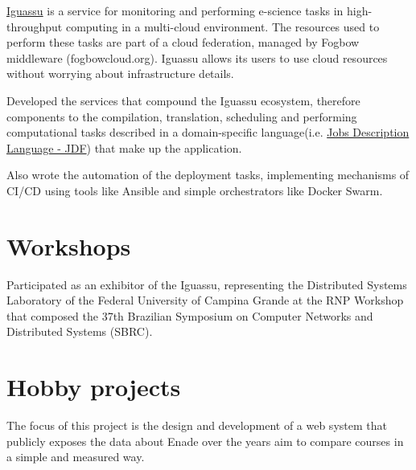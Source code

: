 \documentclass[]{deedy-resume-openfont}
\begin{document}
\begin{minipage}[t]{0.65\textwidth}
\vspace{\topsep} %
\begin{tightemize}
\item \href{https://github.com/ufcg-lsd/iguassu}{Iguassu} is a service for monitoring and performing e-science tasks in high-throughput computing in a multi-cloud environment. The resources used to perform these tasks are part of a cloud federation, managed by Fogbow middleware (fogbowcloud.org). Iguassu allows its users to use cloud resources without worrying about infrastructure details.
\item Developed the services that compound the Iguassu ecosystem, therefore components to the compilation, translation, scheduling and performing computational tasks described in a domain-specific language(i.e. \href{http://ourgrid.lsd.ufcg.edu.br/use.php#site1}{Jobs Description Language - JDF}) that make up the application.
\item Also wrote the automation of the deployment tasks, implementing mechanisms of CI/CD using tools like Ansible and simple orchestrators like Docker Swarm.
\end{tightemize}
\sectionsep

\section{Workshops}

\vspace{\topsep} %
\begin{tightemize}
\item Participated as an exhibitor of the Iguassu, representing the Distributed Systems Laboratory of the Federal University of Campina Grande at the RNP Workshop that composed the 37th Brazilian Symposium on Computer Networks and Distributed Systems (SBRC).
\end{tightemize}
\sectionsep

\section{Hobby projects}

\vspace{\topsep} %
\begin{tightemize}
\item The focus of this project is the design and development of a web system that publicly exposes the data about Enade over the years aim to compare courses in a simple and measured way.
\end{tightemize}
\sectionsep

\sectionsep
\end{minipage} 
\end{document}
